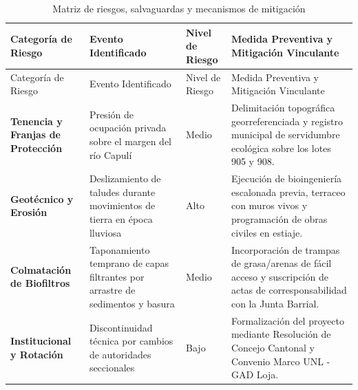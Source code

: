 \documentclass[
  spanish,
  letterpaper,
  DIV=11,
  numbers=noendperiod]{scrartcl}
\begin{document}
\begin{longtable}[]{@{}
  >{\raggedright\arraybackslash}p{}
  >{\raggedright\arraybackslash}p{}
  >{\centering\arraybackslash}p{}
  >{\raggedright\arraybackslash}p{}@{}}
\caption{Matriz de riesgos, salvaguardas y mecanismos de
mitigación}\label{tbl-salvaguardas}\tabularnewline
\toprule\noalign{}
\begin{minipage}[b]{\linewidth}\raggedright
Categoría de Riesgo
\end{minipage} & \begin{minipage}[b]{\linewidth}\raggedright
Evento Identificado
\end{minipage} & \begin{minipage}[b]{\linewidth}\centering
Nivel de Riesgo
\end{minipage} & \begin{minipage}[b]{\linewidth}\raggedright
Medida Preventiva y Mitigación Vinculante
\end{minipage} \\
\midrule\noalign{}
\endfirsthead
\toprule\noalign{}
\begin{minipage}[b]{\linewidth}\raggedright
Categoría de Riesgo
\end{minipage} & \begin{minipage}[b]{\linewidth}\raggedright
Evento Identificado
\end{minipage} & \begin{minipage}[b]{\linewidth}\centering
Nivel de Riesgo
\end{minipage} & \begin{minipage}[b]{\linewidth}\raggedright
Medida Preventiva y Mitigación Vinculante
\end{minipage} \\
\midrule\noalign{}
\endhead
\bottomrule\noalign{}
\endlastfoot
\textbf{Tenencia y Franjas de Protección} & Presión de ocupación privada
sobre el margen del río Capulí & Medio & Delimitación topográfica
georreferenciada y registro municipal de servidumbre ecológica sobre los
lotes 905 y 908. \\
\textbf{Geotécnico y Erosión} & Deslizamiento de taludes durante
movimientos de tierra en época lluviosa & Alto & Ejecución de
bioingeniería escalonada previa, terraceo con muros vivos y programación
de obras civiles en estiaje. \\
\textbf{Colmatación de Biofiltros} & Taponamiento temprano de capas
filtrantes por arrastre de sedimentos y basura & Medio & Incorporación
de trampas de grasa/arenas de fácil acceso y suscripción de actas de
corresponsabilidad con la Junta Barrial. \\
\textbf{Institucional y Rotación} & Discontinuidad técnica por cambios
de autoridades seccionales & Bajo & Formalización del proyecto mediante
Resolución de Concejo Cantonal y Convenio Marco UNL - GAD Loja. \\
\end{longtable}
\end{document}
